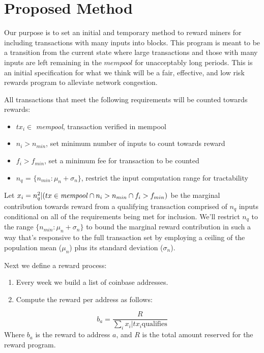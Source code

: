 \documentclass[11pt, oneside]{article}   	%
\begin{document}
\vspace{10 mm}
\section{Proposed Method}
Our purpose is to set an initial and temporary method to reward miners for including transactions with many inputs into blocks. This program is meant to be a transition from the current state where large transactions and those with many inputs are left remaining in the $mempool$ for unacceptably long periods. This is an initial specification for what we think will be a fair, effective, and low risk rewards program to alleviate network congestion. 

All transactions that meet the following requirements will be counted towards rewards:
\begin{itemize}
	\item $tx_{i} \in$ \textit{mempool}, transaction verified in mempool
	\item $n_{i} > n_{min}$, set minimum number of inputs to count towards reward
	\item $f_{i} > f_{min}$, set a minimum fee for transaction to be counted
	\item $n_{q}$ = $\{n_{min} : \mu_{n} + \sigma_{n}\}$, restrict the input computation range for tractability
\end{itemize}

Let $x_{i} = n_{q}^{2} | (tx \in \text{\textit{mempool}} \cap n_{i} > n_{min} \cap f_{i} > f_{min})$ be the marginal contribution towards reward from a qualifying transaction comprised of $n_{q}$ inputs conditional on all of the requirements being met for inclusion. We'll restrict $n_{q}$ to the range $\{n_{min} : \mu_{n} + \sigma_{n}\}$ to bound the marginal reward contribution in such a way that's responsive to the full transaction set by employing a ceiling of the population mean ($\mu_{n}$) plus its standard deviation ($\sigma_{n}$). 

Next we define a reward process:
\begin{enumerate}
	\item Every week we build a list of coinbase addresses.
	\item Compute the reward per address as follows:
\end{enumerate}

\[
	b_{a} = \frac{R}{\sum_{i} x_{i} | tx_{i} \text{qualifies}}
\]
Where $b_{a}$ is the reward to address $a$, and $R$ is the total amount reserved for the reward program. 
\end{document}
